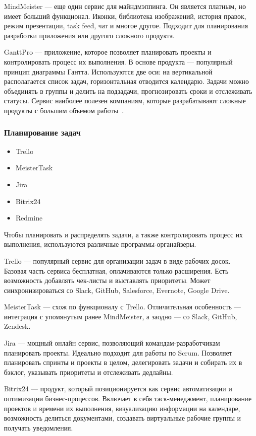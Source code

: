 \documentclass[]{../industrial-development}
\begin{document}
MindMeister — еще один сервис для майндмэппинга. Он является платным, но имеет больший функционал. Иконки, библиотека изображений, история правок, режим презентации, task feed, чат и многое другое. Подходит для планирования разработки приложения или другого сложного продукта.

GanttPro — приложение, которое позволяет планировать проекты и контролировать процесс их выполнения. В основе продукта — популярный принцип диаграммы Гантта. Используются две оси: на вертикальной располагается список задач, горизонтальная отводится календарю. Задачи можно объединять в группы и делить на подзадачи, прогнозировать сроки и отслеживать статусы. Сервис наиболее полезен компаниям, которые разрабатывают сложные продукты с большим объемом работы~\cite{NetologyInstruments}.


\begin{frame} \frametitle{Планирование задач} 
\begin{itemize}
\item Trello
\item MeisterTask
\item Jira
\item Bitrix24
\item Redmine
\end{itemize}
\end{frame}

\lecturenotes

Чтобы планировать и распределять задачи, а также контролировать процесс их выполнения, используются различные программы-органайзеры. 

Trello — популярный сервис для организации задач в виде рабочих досок. Базовая часть сервиса бесплатная, оплачиваются только расширения. Есть возможность добавлять чек-листы и выставлять приоритеты. Может синхронизироваться со Slack, GitHub, Salesforce, Evernote, Google Drive.

MeisterTask — схож по функционалу с Trello. Отличительная особенность — интеграция с упомянутым ранее MindMeister, а заодно — со Slack, GitHub, Zendesk.

Jira —  мощный онлайн сервис, позволяющий командам-разработчикам планировать проекты. Идеально подходит для работы по Scrum. Позволяет планировать спринты и проекты в целом, делегировать задачи и собирать их в бэклог, указывать приоритеты и отслеживать дедлайны.

Bitrix24 — продукт, который позиционируется как сервис автоматизации и оптимизации бизнес-процессов. Включает в себя таск-менеджмент, планирование проектов и времени их выполнения, визуализацию информации на календаре, возможность делиться документами, создавать виртуальные рабочие группы и получать уведомления. 
\end{document}
